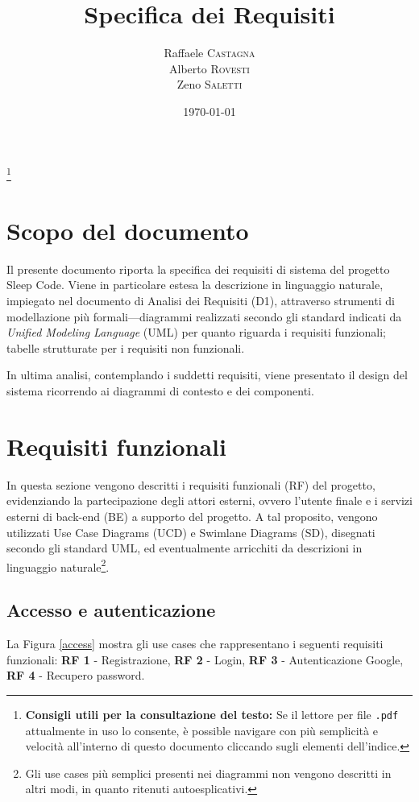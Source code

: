 \documentclass[11pt, a4paper]{article}
\title{Specifica dei Requisiti}
\author{Raffaele \textsc{Castagna}\\
Alberto \textsc{Rovesti}\\
Zeno \textsc{Saletti}}
\date{\today}
\theoremstyle{definition} %
\newcommand\blfootnote[1]{%
  \begingroup
  \renewcommand\thefootnote{}\footnote{#1}%
  \addtocounter{footnote}{-1}%
  \endgroup
}
\begin{document}


\tableofcontents\blfootnote{\textbf{Consigli utili per la consultazione del testo:} Se il lettore per file \texttt{.pdf} attualmente in uso lo consente, è possible navigare con più semplicità e velocità all'interno di questo documento cliccando sugli elementi dell'indice.}

\afterpage{\cfoot{\thepage}}
\newpage
\section*{Scopo del documento}
Il presente documento riporta la specifica dei requisiti di sistema
del progetto Sleep Code. Viene in particolare estesa la descrizione
in linguaggio naturale, impiegato nel documento di Analisi dei Requisiti
(D1), attraverso strumenti di modellazione più formali—diagrammi
realizzati secondo gli standard indicati da \textit{Unified Modeling Language}
(UML) per quanto riguarda i requisiti funzionali; tabelle strutturate
per i requisiti non funzionali.

In ultima analisi, contemplando i suddetti requisiti, viene presentato il
design del sistema ricorrendo ai diagrammi di contesto e dei componenti.


\newpage
\section{Requisiti funzionali}
In questa sezione vengono descritti i requisiti funzionali (RF) del
progetto, evidenziando la partecipazione degli attori esterni, ovvero
l'utente finale e i servizi esterni di back-end (BE) a supporto del progetto. A tal
proposito, vengono utilizzati Use Case Diagrams (UCD) e Swimlane Diagrams (SD),
disegnati secondo gli standard UML, ed eventualmente arricchiti da
descrizioni in linguaggio naturale\footnote{Gli use cases più semplici
presenti nei diagrammi non vengono descritti in altri modi, in quanto ritenuti
autoesplicativi.}.

\subsection{Accesso e autenticazione}\label{accessoeautenticazione}
La Figura \ref{access} mostra gli use cases che rappresentano i seguenti
requisiti funzionali: \textbf{RF 1} - Registrazione,
\textbf{RF 2} - Login, \textbf{RF 3} - Autenticazione Google, \textbf{RF 4} - Recupero
password.
\end{document}
